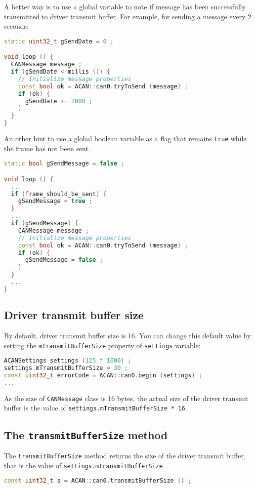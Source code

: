 \documentclass[10pt, a4paper, obeyspaces, openany]{extarticle}
\newcommand \subsectionLabel[2]{\subsection{#1}\label{subsec:#2}}
\begin{document}
A better way is to use a global variable to note if  message has been successfully transmitted to driver transmit buffer. For example, for sending a message every 2 seconds: 

{ \small
  \begin{lstlisting}[language=c++]
static uint32_t gSendDate = 0 ;

void loop () {
  CANMessage message ;
  if (gSendDate < millis ()) {
    // Initialize message properties
    const bool ok = ACAN::can0.tryToSend (message) ;
    if (ok) {
      gSendDate += 2000 ;
    }
  }
}
  \end{lstlisting}
}

An other hint to use a global boolean variable as a flag that remains \texttt{true} while the frame has not been sent.

{ \small
  \begin{lstlisting}[language=c++]
static bool gSendMessage = false ;

void loop () {
  ...
  if (frame_should_be_sent) {
    gSendMessage = true ;
  }
  ...
  if (gSendMessage) {
    CANMessage message ;
    // Initialize message properties
    const bool ok = ACAN::can0.tryToSend (message) ;
    if (ok) {
      gSendMessage = false ;
    }
  }
  ...
}
  \end{lstlisting}
}


\subsectionLabel{Driver transmit buffer size}{driverTransmitBufferSize}

By default, driver transmit buffer size is 16. You can change this default value by setting the \texttt{mTransmitBufferSize} property of \texttt{settings} variable:

{ \small\begin{lstlisting}[language=c++]
ACANSettings settings (125 * 1000) ;
settings.mTransmitBufferSize = 30 ;
const uint32_t errorCode = ACAN::can0.begin (settings) ;
...
\end{lstlisting}}

As the size of \texttt{CANMessage} class is 16 bytes, the actual size of the driver transmit buffer is the value of \texttt{settings.mTransmitBufferSize * 16}.


\subsection{The \texttt{transmitBufferSize} method}

The \texttt{transmitBufferSize} method returns the size of the driver transmit buffer, that is the value of \texttt{settings.mTransmitBufferSize}.
{ \small\begin{lstlisting}[language=c++]
const uint32_t s = ACAN::can0.transmitBufferSize () ;
\end{lstlisting}}
\end{document}
